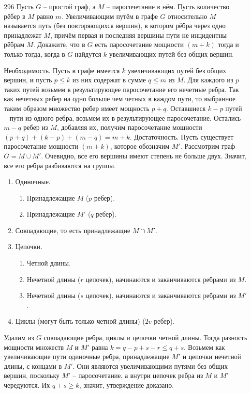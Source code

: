 \begin{task}{296}
Пусть $G$ -- простой граф, а $M$ -- паросочетание в нём. Пусть количество рёбер в $M$ равно $m$. Увеличивающим путём в графе $G$ относительно $M$ называется путь (без повторяющихся вершин), в котором рёбра через одно принадлежат $M$, причём первая и последняя вершины пути не инцидентны рёбрам $M$. Докажите, что в $G$ есть паросочетание мощности $(m + k)$ тогда и только тогда, когда в $G$ найдутся $k$ увеличивающих путей без общих вершин.
\end{task}

\begin{solution}
Необходимость. Пусть в графе имеется $k$ увеличивающих путей без общих вершин, и пусть $p \leq k$ из них содержат в сумме $q \leq m$ из $M$. Для каждого из $p$ таких путей возьмем в результирующее паросочетание его нечетные ребра. Так как нечетных ребер на одно больше чем четных в каждом пути, то выбранное таким образом множество ребер имеет мощность $p + q$. Оставшиеся $k - p$ путей -- пути из одного ребра, возьмем их в результирующее паросочетание. Остались $m - q$ ребер из $M$, добавляя их, получим паросочетание мощности $(p + q) + (k - p) + (m - q) = m + k$.\newline
Достаточность. Пусть существует паросочетание мощности $(m + k)$, которое обозначим $M'$. Рассмотрим граф $G = M \cup M'$. Очевидно, все его вершины имеют степень не больше двух. Значит, все его ребра разбиваются на группы.
\begin{enumerate}
    \item 
    Одиночные.
    \begin{enumerate}
        \item 
        Принадлежащие $M$ ($p$ ребер).
        \item
        Принадлежащие $M'$ ($q$ ребер).
    \end{enumerate}
    \item 
    Совпадающие, то есть принадлежащие  $M \cap M'$.
    \item
    Цепочки.
    \begin{enumerate}
        \item Четной длины.
        \item Нечетной длины ($r$ цепочек), начинаются и заканчиваются ребрами из $M$.
        \item Нечетной длины ($s$ цепочек), начинаются и заканчиваются ребрами из $M'$.
    \end{enumerate}
    \item
    Циклы (могут быть только четной длины) ($2v$ ребер).
\end{enumerate}
Удалим из $G$ совпадающие ребра, циклы и цепочки четной длины. Тогда разность мощности множеств $M$ и $M'$ равна $k = q - p + s - r \leq q + s$. Возьмем как увеличивающие пути одиночные ребра, принадлежащие $M'$ и цепочки нечетной длины, с концами в $M'$. Они являются увеличивающими путями без общих вершин, поскольку $M'$ -- паросочетание, а внутри цепочек ребра из $M$ и $M'$ чередуются. Их $q + s \geq k$, значит, утверждение доказано.
\end{solution}